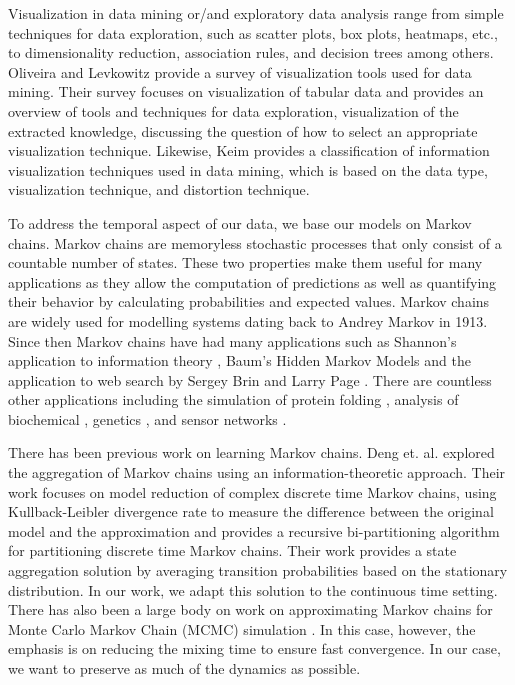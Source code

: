 Visualization in data mining or/and exploratory data analysis range from simple techniques for data exploration, such as
scatter plots, box plots, heatmaps, etc., to dimensionality reduction, %
association rules, and decision trees among others.  %
%
Oliveira and Levkowitz \cite{1207445} provide a survey of visualization tools used for data mining. Their survey focuses
on visualization of tabular data and provides an overview of tools and techniques for data exploration,
visualization of the extracted knowledge, discussing the question of how to select an appropriate visualization
technique.
%
Likewise, Keim \cite{981847} provides a classification of information visualization techniques used in data mining, which is based on
the data type, visualization technique, and distortion technique.

To address the temporal aspect of our data, we base our models on  Markov chains. Markov chains are memoryless stochastic processes that only consist of a countable number of states. These two properties make them useful for many applications as they allow the computation of predictions as
well as quantifying their behavior by calculating probabilities and expected values. Markov chains are widely used for modelling systems dating back to Andrey Markov  in 1913. Since then
Markov chains have had many applications such as Shannon's application to information theory \cite{Shannon:1948},
Baum's Hidden Markov Models  and the application to web search by Sergey Brin and Larry Page \cite{Lawrence981}. 
%
There are countless other applications including the simulation of protein folding \cite{pande-beauchamp-bowman:2010:methods:markov-model-review},
analysis of biochemical ,
genetics \cite{Huelsenbeck2310}, and 
sensor networks \cite{DBLP:journals/corr/AlsheikhHNTL15}.%

There has been previous work on learning Markov chains. Deng et. al. \cite{5746509} explored the aggregation of Markov chains using an information-theoretic
approach. Their work focuses on model reduction of complex discrete time Markov chains, using Kullback-Leibler divergence
rate to measure the difference between the original model and the approximation and provides a recursive bi-partitioning
algorithm for partitioning discrete time Markov chains. Their work provides a state aggregation solution by averaging
transition probabilities based on the stationary distribution. In our work, we adapt this solution to the continuous time
setting.
%
There has also been a large body on work on approximating Markov chains for Monte Carlo Markov Chain (MCMC) simulation \cite{RSSD:RSSD117,HASTINGS01041970}.
In this case, however, the emphasis is on reducing the mixing time to ensure fast convergence. In our case, we want to preserve as much of the dynamics as possible.

